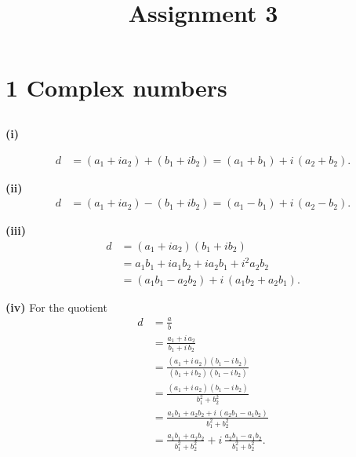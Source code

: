 \documentclass[12pt]{article}
\title{Assignment 3}
\begin{document}
\maketitle

\section{1 Complex numbers}

\subsection{} %

\textbf{(i)} 

\begin{equation}
\begin{aligned}
d &=(a_1 + i a_2) + (b_1 + i b_2) = (a_1 + b_1) + i\,(a_2 + b_2).
\end{aligned}
\end{equation}

\textbf{(ii)}
\begin{equation}
\begin{aligned}
d &=(a_1 + i a_2) - (b_1 + i b_2) = (a_1 - b_1) + i\,(a_2 - b_2).
\end{aligned}
\end{equation}

\textbf{(iii)} 
\begin{equation}
\begin{aligned}
d &=(a_1 + i a_2)(b_1 + i b_2) \\
&= a_1b_1 + i a_1b_2 + i a_2b_1 + i^2 a_2b_2\\
&= (a_1b_1 - a_2b_2) + i\,(a_1b_2 + a_2b_1).
\end{aligned}
\end{equation}

\textbf{(iv)} For the quotient 
\begin{equation}
\begin{aligned}
d &= \frac{a}{b} \\
&= \frac{a_1 + i\,a_2}{b_1 + i\,b_2}\\
&= \frac{(a_1 + i\,a_2)(b_1 - i\,b_2)}{(b_1 + i\,b_2)(b_1 - i\,b_2)}\\
&= \frac{(a_1 + i\,a_2)(b_1 - i\,b_2)}{b_1^2 + b_2^2} \\
&= \frac{a_1b_1 + a_2b_2 + i\,(a_2b_1 - a_1b_2)}{b_1^2 + b_2^2}\\
&= \frac{a_1b_1 + a_2b_2}{b_1^2+b_2^2} + i\,\frac{a_2b_1 - a_1b_2}{b_1^2+b_2^2}.
\end{aligned}
\end{equation}
\end{document}
